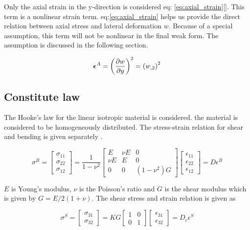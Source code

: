 \documentclass[main.tex]{subfiles}
\begin{document}
Only the axial strain in the y-direction is considered  eq: \ref{eq:axial_strain}[\cite{JianLi2012}]. This term is a nonlinear strain term. eq:\ref{eq:axial_strain} helps us provide the direct relation between axial stress and lateral deformation $w$.  Because of a special assumption, this term will not be nonlinear in the final weak form. The assumption is discussed in the following section. 

\begin{align}\label{eq:axial_strain}
\boldsymbol{\epsilon}^A = 
 \left( \dfrac{\partial w}{\partial y} \right)^2
 =
 \left( w_{,2} \right)^2
\end{align}


\subsection{Constitute law}

The Hooke's law for the linear isotropic material is considered. the material is considered to be homogeneously distributed. The stress-strain relation for shear and bending is given separately \cite{ShellsandPlates_Gould}.

\begin{equation}
\sigma^B = \begin{bmatrix}
\sigma_{11}
\\
\sigma_{22}
\\
 \sigma_{12}
\end{bmatrix}
=\dfrac{1}{1-\nu^2}
\begin{bmatrix}
E & \nu E & 0
\\
\nu E & E & 0
\\
0 & 0 & (1-\nu^2)G
\end{bmatrix}
\begin{bmatrix}
\epsilon_{11}
\\
\epsilon_{22}
\\
 \epsilon_{12}
\end{bmatrix}
=
D \epsilon^B
\end{equation}


$E$ is Young's modulus, $\nu$ is the Poisson's ratio and $G$ is the shear modulus which is given by $G=E / 2 ( 1+\nu ) $. The shear stress and strain relation is given as

\begin{equation}
\sigma^S = \begin{bmatrix}
\sigma_{31}
\\
 \sigma_{32}
\end{bmatrix}
=KG
\begin{bmatrix}
1 & 0 
\\
0 & 1 
\end{bmatrix}
\begin{bmatrix}
\epsilon_{31}
\\
\epsilon_{32}
\end{bmatrix}
=
D_c \epsilon^S
\end{equation}
\end{document}
